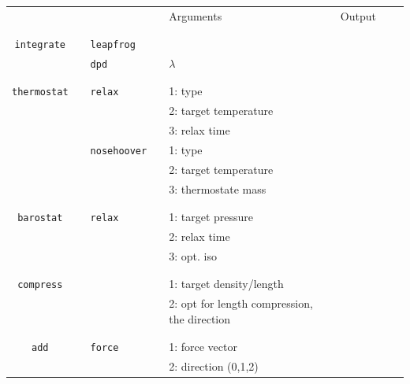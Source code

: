 \documentclass[11pt]{article}
\begin{document}
\clearpage
\begin{center}
  
  \begin{tabular}{cclclclll}
    {\color{red}{\textbf{Action}}} && {\color{blue}{Specifier}} && Arguments && Output \\
                                   && && && \\
    \hline
                                   && && && \\
    \verb!integrate! && \verb!leapfrog! && && \\
    $\mbox{}$ && \verb!dpd!      && $\lambda$ && \\
                                   && && && \\
    \hline
                                   && && && \\
    \verb!thermostat! && \verb!relax! && 1: type && \\
    $\mbox{}$   &&       && 2: target temperature && \\
    $\mbox{}$  &&        && 3: relax time && \\
    $\mbox{}$  && \verb!nosehoover! && 1: type && \\
    $\mbox{}$  &&            && 2: target temperature && \\
    $\mbox{}$  &&            && 3: thermostate mass && \\
                                   && && && \\
    \hline
                                   && && && \\
    \verb!barostat! && \verb!relax! && 1: target pressure && \\
    $\mbox{}$   &&       && 2: relax time && \\
    $\mbox{}$  &&        && 3: opt. iso && \\
                                   && && && \\
    \hline
                                   && && && \\
    \verb!compress! && && 1: target density/length && \\
    $\mbox{}$ &&       && 2: opt for length compression, the direction \\
                                   && && && \\
    \hline
                                   && && && \\
    \verb!add! && \verb!force! && 1: force vector && \\
    $\mbox{}$   &&             && 2: direction (0,1,2) && \\

\end{tabular}
\end{center}
\end{document}
